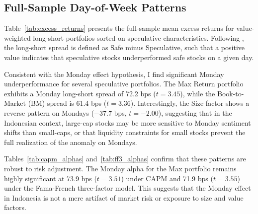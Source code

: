 \documentclass[
	a4paper,
	10pt,
	twoside,
]{LTJournalArticle}
\begin{document}
\subsection{Full-Sample Day-of-Week Patterns}

Table~\ref{tab:excess_returns} presents the full-sample mean excess returns for value-weighted long-short portfolios sorted on speculative characteristics. Following \citet{birru2018}, the long-short spread is defined as Safe minus Speculative, such that a positive value indicates that speculative stocks underperformed safe stocks on a given day.

Consistent with the Monday effect hypothesis, I find significant Monday underperformance for several speculative portfolios. The Max Return portfolio exhibits a Monday long-short spread of 72.2 bps ($t=3.45$), while the Book-to-Market (BM) spread is 61.4 bps ($t=3.36$). Interestingly, the Size factor shows a reverse pattern on Mondays ($-37.7$ bps, $t=-2.00$), suggesting that in the Indonesian context, large-cap stocks may be more sensitive to Monday sentiment shifts than small-caps, or that liquidity constraints for small stocks prevent the full realization of the anomaly on Mondays.

Tables~\ref{tab:capm_alphas} and~\ref{tab:ff3_alphas} confirm that these patterns are robust to risk adjustment. The Monday alpha for the Max portfolio remains highly significant at 73.9 bps ($t=3.51$) under CAPM and 71.9 bps ($t=3.55$) under the Fama-French three-factor model. This suggests that the Monday effect in Indonesia is not a mere artifact of market risk or exposure to size and value factors.

\begin{table}[htbp]
	\caption{Day-of-Week Excess Returns by Speculative Characteristic (bps/month)}
	\label{tab:excess_returns}
	
\end{table}

\begin{table}[htbp]
	\caption{Day-of-Week CAPM Alphas by Speculative Characteristic (bps/month)}
	\label{tab:capm_alphas}
	
\end{table}

\begin{table}[htbp]
	\caption{Day-of-Week Fama-French 3-Factor Alphas by Speculative Characteristic (bps/month)}
	\label{tab:ff3_alphas}
	
\end{table}
\end{document}
